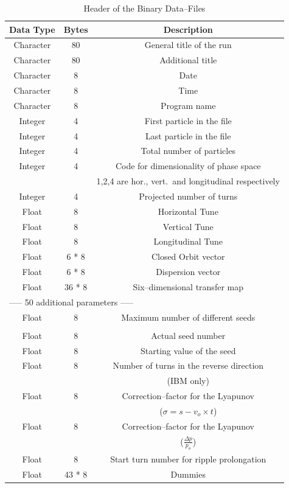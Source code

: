 \documentclass[a4paper,11pt]{report}
\begin{document}
\begin{table}[h]
\caption{Header of the Binary Data--Files}
\vspace{1em}
\label{T-HDF}
\centering
\begin{tabular}{|c|c|c|}
  \hline
  {\bf Data Type} & {\bf Bytes} & {\bf Description} \\
  \hline
  Character & 80 & General title of the run \\
  \hline
  Character & 80 & Additional title \\
  \hline
  Character & 8 & Date \\
  \hline
  Character & 8 & Time \\
  \hline
  Character & 8 & Program name \\
  \hline
  Integer & 4 & First particle in the file \\
  \hline
  Integer & 4 & Last particle in the file \\
  \hline
  Integer & 4 & Total number of particles \\
  \hline
  Integer & 4 & Code for dimensionality of phase space \\
  & & 1,2,4 are hor., vert.\ and longitudinal respectively \\
  \hline
  Integer & 4 & Projected number of turns \\
  \hline
  Float & 8 & Horizontal Tune \\
  \hline
  Float & 8 & Vertical Tune \\
  \hline
  Float & 8 & Longitudinal Tune \\
  \hline
  Float & 6 * 8 & Closed Orbit vector \\
  \hline
  Float & 6 * 8 & Dispersion vector \\
  \hline
  Float & 36 * 8 & Six--dimensional transfer map \\
  \hline
  \multicolumn{3}{|l|}{----- 50 additional parameters -----} \\
  \hline
  Float & 8 & Maximum number of different seeds \\
  & & \\
  \hline
  Float & 8 & Actual seed number \\
  \hline
  Float & 8 & Starting value of the seed \\
  \hline
  Float & 8 & Number of turns in the reverse direction \\
  & & (IBM only) \\
  \hline
  Float & 8 & Correction--factor for the Lyapunov \\
  & & ($\sigma = s - v_o \times t$) \\
  \hline
  Float & 8 & Correction--factor for the Lyapunov \\
  & & (\mbox{$ \frac{\Delta p}{p_o} $}) \\
  \hline
  Float & 8 & Start turn number for ripple prolongation \\
  \hline
  Float & 43 * 8 & Dummies \\
  \hline
\end{tabular}
\end{table}
\end{document}
